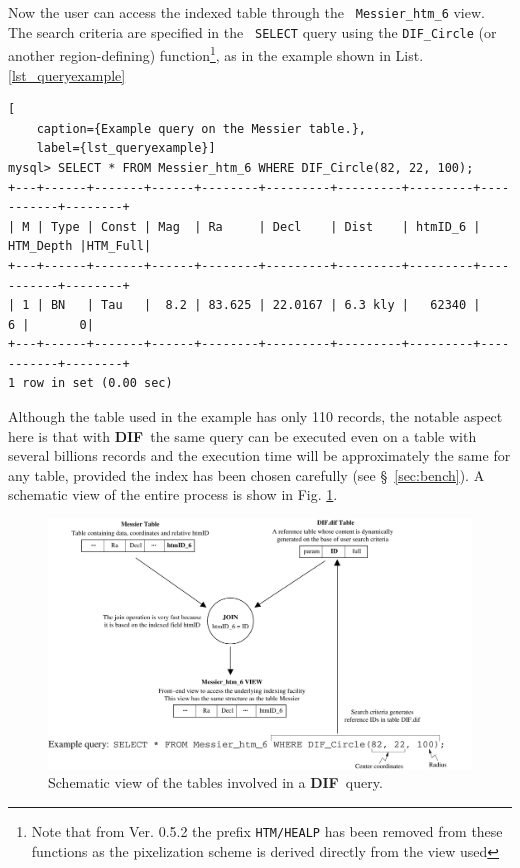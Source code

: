 \documentclass[10pt,titlepage]{article}
\newcommand{\dif}{\textbf{\small DIF}}
\begin{document}
Now the user can access the indexed table through the {\tt
Messier\_htm\_6} view. The search criteria are specified in the {\tt
SELECT} query using the {\tt DIF\_Circle} (or another
region-defining) function\footnote{Note that from Ver. 0.5.2 the prefix
{\tt HTM/HEALP} has been removed from these functions as the pixelization
scheme is derived directly from the view used}, as in the example shown in
List. \ref{lst_queryexample}
\begin{lstlisting}[
    caption={Example query on the Messier table.},
    label={lst_queryexample}]
mysql> SELECT * FROM Messier_htm_6 WHERE DIF_Circle(82, 22, 100);
+---+------+-------+------+--------+---------+---------+---------+-----------+--------+
| M | Type | Const | Mag  | Ra     | Decl    | Dist    | htmID_6 | HTM_Depth |HTM_Full|
+---+------+-------+------+--------+---------+---------+---------+-----------+--------+
| 1 | BN   | Tau   |  8.2 | 83.625 | 22.0167 | 6.3 kly |   62340 |         6 |       0|
+---+------+-------+------+--------+---------+---------+---------+-----------+--------+
1 row in set (0.00 sec)
\end{lstlisting}
Although the table used in the example has only 110 records, the
notable aspect here is that with \dif\ the same query can be executed
even on a table with several billions records and the execution time
will be approximately the same for any table, provided the index has
been chosen carefully (see \S\ \ref{sec:bench}). A schematic view of
the entire process is show in Fig. \ref{fig:schemadif}.
%
\begin{figure}[hbtp]
\begin{center}
\includegraphics[width=14cm,keepaspectratio]{includes/schema}
\end{center}
\caption{Schematic view of the tables involved in a \dif\ query.}
\label{fig:schemadif}
\end{figure}
\end{document}
